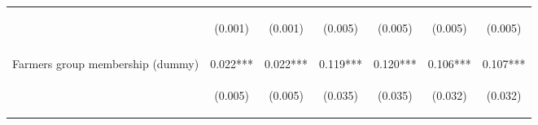 \begin{center}
\begin{tabular}{lcccccc}
 & \begin{footnotesize}(0.001)\end{footnotesize} & \begin{footnotesize}(0.001)\end{footnotesize} & \begin{footnotesize}(0.005)\end{footnotesize} & \begin{footnotesize}(0.005)\end{footnotesize} & \begin{footnotesize}(0.005)\end{footnotesize} & \begin{footnotesize}(0.005)\end{footnotesize} \\
\vspace{4pt} & \begin{footnotesize}[0.001]\end{footnotesize} & \begin{footnotesize}[0.002]\end{footnotesize} & \begin{footnotesize}[0.000]\end{footnotesize} & \begin{footnotesize}[0.000]\end{footnotesize} & \begin{footnotesize}[0.000]\end{footnotesize} & \begin{footnotesize}[0.000]\end{footnotesize} \\
Farmers group membership (dummy) & 0.022*** & 0.022*** & 0.119*** & 0.120*** & 0.106*** & 0.107*** \\
 & \begin{footnotesize}(0.005)\end{footnotesize} & \begin{footnotesize}(0.005)\end{footnotesize} & \begin{footnotesize}(0.035)\end{footnotesize} & \begin{footnotesize}(0.035)\end{footnotesize} & \begin{footnotesize}(0.032)\end{footnotesize} & \begin{footnotesize}(0.032)\end{footnotesize} \\

\end{tabular}
\end{center}
